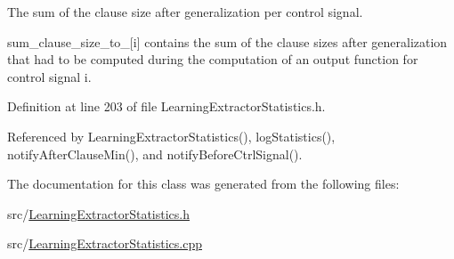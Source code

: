 The sum of the clause size after generalization per control signal. 

sum\-\_\-clause\-\_\-size\-\_\-to\-\_\-\mbox{[}i\mbox{]} contains the sum of the clause sizes after generalization that had to be computed during the computation of an output function for control signal i. 

Definition at line 203 of file Learning\-Extractor\-Statistics.\-h.



Referenced by Learning\-Extractor\-Statistics(), log\-Statistics(), notify\-After\-Clause\-Min(), and notify\-Before\-Ctrl\-Signal().



The documentation for this class was generated from the following files\-:\begin{DoxyCompactItemize}
\item 
src/\hyperlink{LearningExtractorStatistics_8h}{Learning\-Extractor\-Statistics.\-h}\item 
src/\hyperlink{LearningExtractorStatistics_8cpp}{Learning\-Extractor\-Statistics.\-cpp}\end{DoxyCompactItemize}
